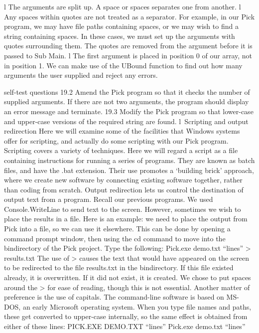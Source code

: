 l	The arguments are split up. A space or spaces separates one from another.
l	Any spaces within quotes are not treated as a separator. For example, in our 
Pick program, we may have ﬁle paths containing spaces, or we may wish to ﬁnd 
a string containing spaces. In these cases, we must set up the arguments with quotes surrounding them. The quotes are removed from the argument before it is passed to Sub Main.
l	The ﬁrst argument is placed in position 0 of our array, not in position 1.
We can make use of the UBound function to ﬁnd out how many arguments the user
supplied and reject any errors.

self-test questions
19.2	Amend the Pick program so that it checks the number of supplied arguments. If there are not two arguments, the program should display an error message and terminate.
19.3	Modify the Pick program so that lower-case and upper-case versions of the required string are found.
l Scripting and output redirection
Here we will examine some of the facilities that Windows systems offer for scripting, and actually do some scripting with our Pick program. Scripting covers a variety of techniques. Here we will regard a script as a ﬁle containing instructions for running 
a series of programs. They are known as batch ﬁles, and have the .bat extension. Their use promotes a ‘building brick’ approach, where we create new software by connecting existing software together, rather than coding from scratch.
Output redirection lets us control the destination of output text from a program. Recall our previous programs. We used Console.WriteLine to send text to the screen. However, sometimes we wish to place the results in a ﬁle. Here is an example: we need to place the output from Pick into a ﬁle, so we can use it elsewhere. This can be done by opening a command prompt window, then using the cd command to move into the bin\Debug directory of the Pick project. Type the following:
Pick.exe demo.txt “lines” > results.txt
The use of > causes the text that would have appeared on the screen to be redirected to the ﬁle results.txt in the bin\Debug directory. If this ﬁle existed already, it is overwritten. If it did not exist, it is created.
We chose to put spaces around the > for ease of reading, though this is not essential.
Another matter of preference is the use of capitals. The command-line software is based on MS-DOS, an early Microsoft operating system. When you type ﬁle names and paths, these get converted to upper-case internally, so the same effect is obtained from either of these lines:
PICK.EXE DEMO.TXT “lines”
Pick.exe demo.txt “lines”
